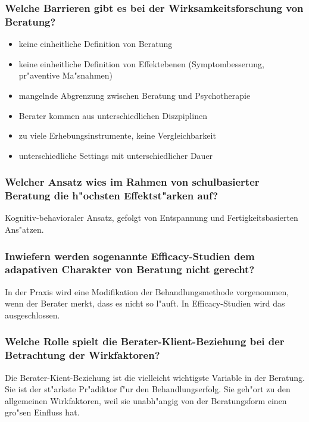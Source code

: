 \subsubsection{Welche Barrieren gibt es bei der Wirksamkeitsforschung von Beratung?}
\begin{itemize}
        \item keine einheitliche Definition von Beratung
        \item keine einheitliche Definition von Effektebenen (Symptombesserung, pr"aventive Ma"snahmen)
        \item mangelnde Abgrenzung zwischen Beratung und Psychotherapie
        \item Berater kommen aus unterschiedlichen Diszpiplinen
        \item zu viele Erhebungsinstrumente, keine Vergleichbarkeit
        \item unterschiedliche Settings mit unterschiedlicher Dauer
\end{itemize}

\subsubsection{Welcher Ansatz wies im Rahmen von schulbasierter Beratung die h"ochsten Effektst"arken auf?}
Kognitiv-behavioraler Ansatz, gefolgt von Entspannung und Fertigkeitsbasierten Ans"atzen.

\subsubsection{Inwiefern werden sogenannte Efficacy-Studien dem adapativen Charakter von Beratung nicht gerecht?}
In der Praxis wird eine Modifikation der Behandlungsmethode vorgenommen, wenn der Berater merkt, dass es nicht so l"auft. In Efficacy-Studien wird das ausgeschlossen.

\subsubsection{Welche Rolle spielt die Berater-Klient-Beziehung bei der Betrachtung der Wirkfaktoren?}
Die Berater-Kient-Beziehung ist die vielleicht wichtigste Variable in der Beratung. Sie ist der st"arkste Pr"adiktor f"ur den Behandlungserfolg. Sie geh"ort zu den allgemeinen Wirkfaktoren, weil sie unabh"angig von der Beratungsform einen gro"sen Einfluss hat.  
